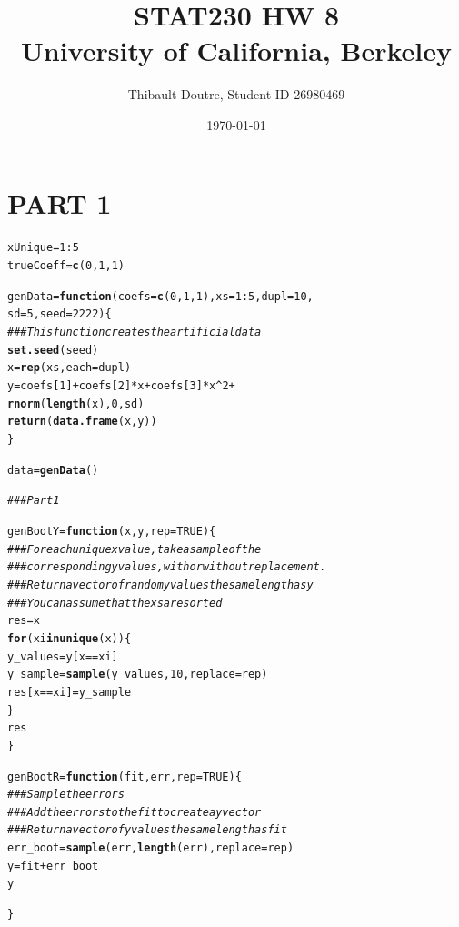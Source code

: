 \documentclass[11pt]{article}\usepackage[]{graphicx}\usepackage[]{color}
\author{Thibault Doutre, Student ID 26980469}
\title{STAT230 HW 8 \\
University of California, Berkeley}
\date{\today}
\makeatletter
\newcommand{\hlnum}[1]{\textcolor[rgb]{0.686,0.059,0.569}{#1}}%
\newcommand{\hlcom}[1]{\textcolor[rgb]{0.678,0.584,0.686}{\textit{#1}}}%
\newcommand{\hlopt}[1]{\textcolor[rgb]{0,0,0}{#1}}%
\newcommand{\hlstd}[1]{\textcolor[rgb]{0.345,0.345,0.345}{#1}}%
\newcommand{\hlkwa}[1]{\textcolor[rgb]{0.161,0.373,0.58}{\textbf{#1}}}%
\newcommand{\hlkwb}[1]{\textcolor[rgb]{0.69,0.353,0.396}{#1}}%
\newcommand{\hlkwc}[1]{\textcolor[rgb]{0.333,0.667,0.333}{#1}}%
\newcommand{\hlkwd}[1]{\textcolor[rgb]{0.737,0.353,0.396}{\textbf{#1}}}%
\newenvironment{kframe}{%
 \def\at@end@of@kframe{}%
 \ifinner\ifhmode%
  \def\at@end@of@kframe{\end{minipage}}%
  \begin{minipage}{\columnwidth}%
 \fi\fi%
 \def\FrameCommand##1{\hskip\@totalleftmargin \hskip-\fboxsep
 \colorbox{shadecolor}{##1}\hskip-\fboxsep
     \hskip-\linewidth \hskip-\@totalleftmargin \hskip\columnwidth}%
 \MakeFramed {\advance\hsize-\width
   \@totalleftmargin\z@ \linewidth\hsize
   \@setminipage}}%
 {\par\unskip\endMakeFramed%
 \at@end@of@kframe}
\newenvironment{knitrout}{}{} %
\makeatother
\begin{document}
\maketitle
\section{PART 1}
\begin{knitrout}
\color{fgcolor}\begin{kframe}
\begin{alltt}
\hlstd{xUnique} \hlkwb{=} \hlnum{1}\hlopt{:}\hlnum{5}
\hlstd{trueCoeff} \hlkwb{=} \hlkwd{c}\hlstd{(}\hlnum{0}\hlstd{,} \hlnum{1}\hlstd{,} \hlnum{1}\hlstd{)}

\hlstd{genData} \hlkwb{=} \hlkwa{function}\hlstd{(}\hlkwc{coefs} \hlstd{=} \hlkwd{c}\hlstd{(}\hlnum{0}\hlstd{,} \hlnum{1}\hlstd{,} \hlnum{1}\hlstd{),} \hlkwc{xs} \hlstd{=} \hlnum{1}\hlopt{:}\hlnum{5}\hlstd{,} \hlkwc{dupl} \hlstd{=} \hlnum{10}\hlstd{,}
                   \hlkwc{sd} \hlstd{=} \hlnum{5}\hlstd{,} \hlkwc{seed}\hlstd{=}\hlnum{2222}\hlstd{)\{}
  \hlcom{### This function creates the artificial data}
  \hlkwd{set.seed}\hlstd{(seed)}
  \hlstd{x} \hlkwb{=} \hlkwd{rep}\hlstd{(xs,} \hlkwc{each} \hlstd{= dupl)}
  \hlstd{y} \hlkwb{=} \hlstd{coefs[}\hlnum{1}\hlstd{]} \hlopt{+} \hlstd{coefs[}\hlnum{2}\hlstd{]}\hlopt{*}\hlstd{x} \hlopt{+} \hlstd{coefs[}\hlnum{3}\hlstd{]} \hlopt{*} \hlstd{x}\hlopt{^}\hlnum{2} \hlopt{+}
    \hlkwd{rnorm}\hlstd{(}\hlkwd{length}\hlstd{(x),} \hlnum{0}\hlstd{, sd)}
  \hlkwd{return}\hlstd{(}\hlkwd{data.frame}\hlstd{(x, y))}
\hlstd{\}}

\hlstd{data} \hlkwb{=} \hlkwd{genData}\hlstd{()}

\hlcom{## # Part 1}

\hlstd{genBootY} \hlkwb{=} \hlkwa{function}\hlstd{(}\hlkwc{x}\hlstd{,} \hlkwc{y}\hlstd{,} \hlkwc{rep} \hlstd{=} \hlnum{TRUE}\hlstd{)\{}
  \hlcom{### For each unique x value, take a sample of the}
  \hlcom{### corresponding y values, with or without replacement.}
  \hlcom{### Return a vector of random y values the same length as y}
  \hlcom{### You can assume that the xs are sorted}
  \hlstd{res} \hlkwb{=} \hlstd{x}
  \hlkwa{for} \hlstd{(xi} \hlkwa{in} \hlkwd{unique}\hlstd{(x))\{}
    \hlstd{y_values} \hlkwb{=} \hlstd{y[x} \hlopt{==} \hlstd{xi]}
    \hlstd{y_sample} \hlkwb{=} \hlkwd{sample}\hlstd{(y_values,} \hlnum{10}\hlstd{,} \hlkwc{replace} \hlstd{= rep)}
    \hlstd{res[x} \hlopt{==} \hlstd{xi]} \hlkwb{=} \hlstd{y_sample}
  \hlstd{\}}
  \hlstd{res}
\hlstd{\}}

\hlstd{genBootR} \hlkwb{=} \hlkwa{function}\hlstd{(}\hlkwc{fit}\hlstd{,} \hlkwc{err}\hlstd{,} \hlkwc{rep} \hlstd{=} \hlnum{TRUE}\hlstd{)\{}
  \hlcom{### Sample the errors }
  \hlcom{### Add the errors to the fit to create a y vector}
  \hlcom{### Return a vector of y values the same length as fit}
  \hlstd{err_boot} \hlkwb{=} \hlkwd{sample}\hlstd{(err,} \hlkwd{length}\hlstd{(err),} \hlkwc{replace} \hlstd{= rep)}
  \hlstd{y} \hlkwb{=} \hlstd{fit} \hlopt{+} \hlstd{err_boot}
  \hlstd{y}

\hlstd{\}}
\end{alltt}
\end{kframe}
\end{knitrout}
\end{document}

